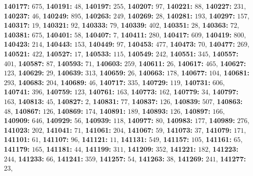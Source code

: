\textsf{\bfseries 140177:} $675$, \textsf{\bfseries 140191:} $48$, \textsf{\bfseries 140197:} $255$, \textsf{\bfseries 140207:} $97$, \textsf{\bfseries 140221:} $88$, \textsf{\bfseries 140227:} $231$, \textsf{\bfseries 140237:} $46$, \textsf{\bfseries 140249:} $895$, \textsf{\bfseries 140263:} $249$, \textsf{\bfseries 140269:} $28$, \textsf{\bfseries 140281:} $193$, \textsf{\bfseries 140297:} $157$, \textsf{\bfseries 140317:} $19$, \textsf{\bfseries 140321:} $92$, \textsf{\bfseries 140333:} $79$, \textsf{\bfseries 140339:} $402$, \textsf{\bfseries 140351:} $28$, \textsf{\bfseries 140363:} $72$, \textsf{\bfseries 140381:} $675$, \textsf{\bfseries 140401:} $58$, \textsf{\bfseries 140407:} $7$, \textsf{\bfseries 140411:} $280$, \textsf{\bfseries 140417:} $609$, \textsf{\bfseries 140419:} $800$, \textsf{\bfseries 140423:} $214$, \textsf{\bfseries 140443:} $153$, \textsf{\bfseries 140449:} $97$, \textsf{\bfseries 140453:} $477$, \textsf{\bfseries 140473:} $70$, \textsf{\bfseries 140477:} $269$, \textsf{\bfseries 140521:} $422$, \textsf{\bfseries 140527:} $17$, \textsf{\bfseries 140533:} $115$, \textsf{\bfseries 140549:} $242$, \textsf{\bfseries 140551:} $345$, \textsf{\bfseries 140557:} $401$, \textsf{\bfseries 140587:} $87$, \textsf{\bfseries 140593:} $71$, \textsf{\bfseries 140603:} $259$, \textsf{\bfseries 140611:} $26$, \textsf{\bfseries 140617:} $465$, \textsf{\bfseries 140627:} $123$, \textsf{\bfseries 140629:} $29$, \textsf{\bfseries 140639:} $313$, \textsf{\bfseries 140659:} $26$, \textsf{\bfseries 140663:} $178$, \textsf{\bfseries 140677:} $104$, \textsf{\bfseries 140681:} $293$, \textsf{\bfseries 140683:} $204$, \textsf{\bfseries 140689:} $46$, \textsf{\bfseries 140717:} $335$, \textsf{\bfseries 140729:} $119$, \textsf{\bfseries 140731:} $606$, \textsf{\bfseries 140741:} $396$, \textsf{\bfseries 140759:} $123$, \textsf{\bfseries 140761:} $163$, \textsf{\bfseries 140773:} $162$, \textsf{\bfseries 140779:} $34$, \textsf{\bfseries 140797:} $163$, \textsf{\bfseries 140813:} $45$, \textsf{\bfseries 140827:} $2$, \textsf{\bfseries 140831:} $77$, \textsf{\bfseries 140837:} $126$, \textsf{\bfseries 140839:} $507$, \textsf{\bfseries 140863:} $48$, \textsf{\bfseries 140867:} $126$, \textsf{\bfseries 140869:} $174$, \textsf{\bfseries 140891:} $189$, \textsf{\bfseries 140893:} $126$, \textsf{\bfseries 140897:} $166$, \textsf{\bfseries 140909:} $646$, \textsf{\bfseries 140929:} $56$, \textsf{\bfseries 140939:} $118$, \textsf{\bfseries 140977:} $80$, \textsf{\bfseries 140983:} $177$, \textsf{\bfseries 140989:} $276$, \textsf{\bfseries 141023:} $202$, \textsf{\bfseries 141041:} $71$, \textsf{\bfseries 141061:} $204$, \textsf{\bfseries 141067:} $59$, \textsf{\bfseries 141073:} $37$, \textsf{\bfseries 141079:} $171$, \textsf{\bfseries 141101:} $61$, \textsf{\bfseries 141107:} $96$, \textsf{\bfseries 141121:} $11$, \textsf{\bfseries 141131:} $549$, \textsf{\bfseries 141157:} $105$, \textsf{\bfseries 141161:} $65$, \textsf{\bfseries 141179:} $165$, \textsf{\bfseries 141181:} $44$, \textsf{\bfseries 141199:} $311$, \textsf{\bfseries 141209:} $352$, \textsf{\bfseries 141221:} $182$, \textsf{\bfseries 141223:} $244$, \textsf{\bfseries 141233:} $66$, \textsf{\bfseries 141241:} $359$, \textsf{\bfseries 141257:} $54$, \textsf{\bfseries 141263:} $38$, \textsf{\bfseries 141269:} $241$, \textsf{\bfseries 141277:} $23$, 
